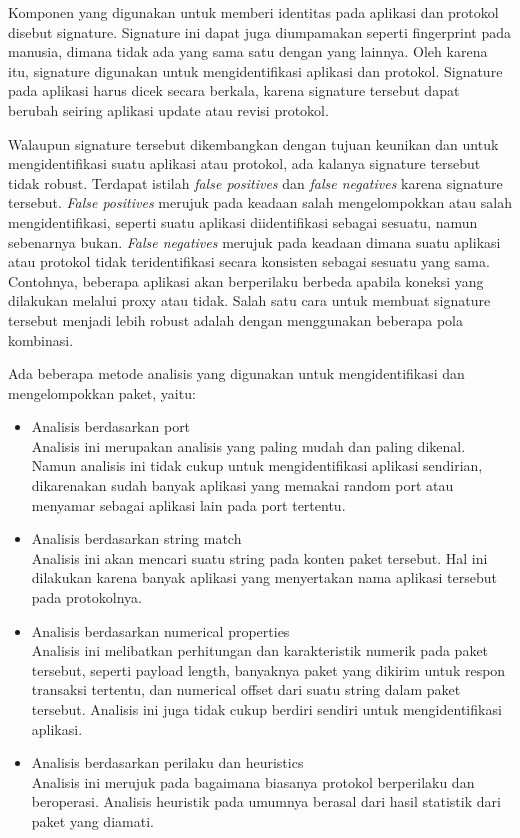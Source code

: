 Komponen yang digunakan untuk memberi identitas pada aplikasi dan protokol disebut signature. Signature ini dapat juga diumpamakan seperti fingerprint pada manusia, dimana tidak ada yang sama satu dengan yang lainnya. Oleh karena itu, signature digunakan untuk mengidentifikasi aplikasi dan protokol. Signature pada aplikasi harus dicek secara berkala, karena signature tersebut dapat berubah seiring aplikasi update atau revisi protokol.

Walaupun signature tersebut dikembangkan dengan tujuan keunikan dan untuk mengidentifikasi suatu aplikasi atau protokol, ada kalanya signature tersebut tidak robust. Terdapat istilah \textit{false positives} dan \textit{false negatives} karena signature tersebut. \textit{False positives} merujuk pada keadaan salah mengelompokkan atau salah mengidentifikasi, seperti suatu aplikasi diidentifikasi sebagai sesuatu, namun sebenarnya bukan. \textit{False negatives} merujuk pada keadaan dimana suatu aplikasi atau protokol tidak teridentifikasi secara konsisten sebagai sesuatu yang sama. Contohnya, beberapa aplikasi akan berperilaku berbeda apabila koneksi yang dilakukan melalui proxy atau tidak. Salah satu cara untuk membuat signature tersebut menjadi lebih robust adalah dengan menggunakan beberapa pola kombinasi.

Ada beberapa metode analisis yang digunakan untuk mengidentifikasi dan mengelompokkan paket, yaitu:
\begin{itemize}
	\item Analisis berdasarkan port\\
	Analisis ini merupakan analisis yang paling mudah dan paling dikenal. Namun analisis ini tidak cukup untuk mengidentifikasi aplikasi sendirian, dikarenakan sudah banyak aplikasi yang memakai random port atau menyamar sebagai aplikasi lain pada port tertentu.
	\item Analisis berdasarkan string match\\
	Analisis ini akan mencari suatu string pada konten paket tersebut. Hal ini dilakukan karena banyak aplikasi yang menyertakan nama aplikasi tersebut pada protokolnya. 
	\item Analisis berdasarkan numerical properties\\
	Analisis ini melibatkan perhitungan dan karakteristik numerik pada paket tersebut, seperti payload length, banyaknya paket yang dikirim untuk respon transaksi tertentu, dan numerical offset dari suatu string dalam paket tersebut. Analisis ini juga tidak cukup berdiri sendiri untuk mengidentifikasi aplikasi.
	\item Analisis berdasarkan perilaku dan heuristics\\
	Analisis ini merujuk pada bagaimana biasanya protokol berperilaku dan beroperasi. Analisis heuristik pada umumnya berasal dari hasil statistik dari paket yang diamati.
\end{itemize}

